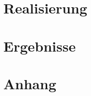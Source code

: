 \part{Realisierung} %




\cleardoublepage %

\part{Ergebnisse} %


\cleardoublepage %


\appendix

\part{Anhang} %



\cleardoublepage %

\cleardoublepage %

\cleardoublepage %

\cleardoublepage %



